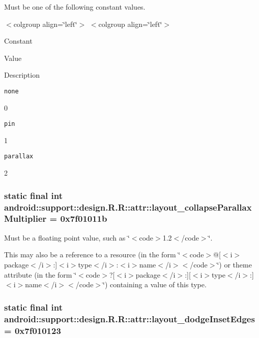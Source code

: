 Must be one of the following constant values. \begin{TabularC}{0}
\hline
\end{TabularC}
$<$colgroup align=\char`\"{}left\char`\"{}$>$ $<$colgroup align=\char`\"{}left\char`\"{}$>$ 

Constant

Value

Description 

{\tt none}

0

{\tt pin}

1

{\tt parallax}

2\hypertarget{classandroid_1_1support_1_1design_1_1_r_1_1attr_be1fcd8104eb9cc1917819a6221e5773}{
\subsubsection[{layout\_\-collapseParallaxMultiplier}]{\setlength{\rightskip}{0pt plus 5cm}static final int android::support::design.R.R::attr::layout\_\-collapseParallaxMultiplier = 0x7f01011b}}
\label{classandroid_1_1support_1_1design_1_1_r_1_1attr_be1fcd8104eb9cc1917819a6221e5773}


Must be a floating point value, such as \char`\"{}$<$code$>$1.2$<$/code$>$\char`\"{}. 

This may also be a reference to a resource (in the form \char`\"{}$<$code$>$@\mbox{[}$<$i$>$package$<$/i$>$:\mbox{]}$<$i$>$type$<$/i$>$:$<$i$>$name$<$/i$>$$<$/code$>$\char`\"{}) or theme attribute (in the form \char`\"{}$<$code$>$?\mbox{[}$<$i$>$package$<$/i$>$:\mbox{]}\mbox{[}$<$i$>$type$<$/i$>$:\mbox{]}$<$i$>$name$<$/i$>$$<$/code$>$\char`\"{}) containing a value of this type. \hypertarget{classandroid_1_1support_1_1design_1_1_r_1_1attr_290e46857675b056dbb9e1dc883b67e8}{
\subsubsection[{layout\_\-dodgeInsetEdges}]{\setlength{\rightskip}{0pt plus 5cm}static final int android::support::design.R.R::attr::layout\_\-dodgeInsetEdges = 0x7f010123}}
\label{classandroid_1_1support_1_1design_1_1_r_1_1attr_290e46857675b056dbb9e1dc883b67e8}


